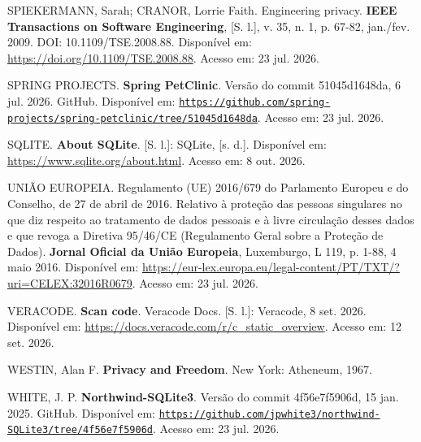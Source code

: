 \documentclass[12pt,a4paper,oneside]{report}
\newcommand{\tituloref}[1]{\textbf{#1}}
\begin{document}
SPIEKERMANN, Sarah; CRANOR, Lorrie Faith. Engineering privacy. \tituloref{IEEE Transactions on Software Engineering}, [S. l.], v. 35, n. 1, p. 67-82, jan./fev. 2009. DOI: 10.1109/TSE.2008.88. Disponível em: \url{https://doi.org/10.1109/TSE.2008.88}. Acesso em: 23 jul. 2026.

SPRING PROJECTS. \tituloref{Spring PetClinic}. Versão do commit 51045d1648da, 6 jul. 2026. GitHub. Disponível em: \href{https://github.com/spring-projects/spring-petclinic/tree/51045d1648dad955df586150c1a1a6e22ef400c2}{\nolinkurl{https://github.com/spring-projects/spring-petclinic/tree/51045d1648da}}. Acesso em: 23 jul. 2026.

SQLITE. \tituloref{About SQLite}. [S. l.]: SQLite, [s. d.]. Disponível em: \url{https://www.sqlite.org/about.html}. Acesso em: 8 out. 2026.

UNIÃO EUROPEIA. Regulamento (UE) 2016/679 do Parlamento Europeu e do Conselho, de 27 de abril de 2016. Relativo à proteção das pessoas singulares no que diz respeito ao tratamento de dados pessoais e à livre circulação desses dados e que revoga a Diretiva 95/46/CE (Regulamento Geral sobre a Proteção de Dados). \tituloref{Jornal Oficial da União Europeia}, Luxemburgo, L 119, p. 1-88, 4 maio 2016. Disponível em: \url{https://eur-lex.europa.eu/legal-content/PT/TXT/?uri=CELEX:32016R0679}. Acesso em: 23 jul. 2026.

VERACODE. \tituloref{Scan code}. Veracode Docs. [S. l.]: Veracode, 8 set. 2026. Disponível em: \url{https://docs.veracode.com/r/c_static_overview}. Acesso em: 12 set. 2026.

WESTIN, Alan F. \tituloref{Privacy and Freedom}. New York: Atheneum, 1967.

WHITE, J. P. \tituloref{Northwind-SQLite3}. Versão do commit 4f56e7f5906d, 15 jan. 2025. GitHub. Disponível em: \href{https://github.com/jpwhite3/northwind-SQLite3/tree/4f56e7f5906dfd23b25244c5bfe8fb5da6402efd}{\nolinkurl{https://github.com/jpwhite3/northwind-SQLite3/tree/4f56e7f5906d}}. Acesso em: 23 jul. 2026.

\endgroup
\end{document}
